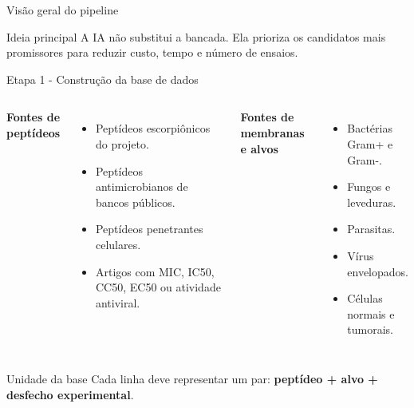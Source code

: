 \documentclass[aspectratio=169,10pt]{beamer}
\begin{document}
\begin{frame}{Visão geral do pipeline}
\begin{center}
\end{center}

\vspace{0.3cm}
\begin{block}{Ideia principal}
A IA não substitui a bancada. Ela prioriza os candidatos mais promissores para reduzir custo, tempo e número de ensaios.
\end{block}
\end{frame}

\begin{frame}{Etapa 1 - Construção da base de dados}
\begin{columns}[T]
\textbf{Fontes de peptídeos}
\begin{itemize}
  \item Peptídeos escorpiônicos do projeto.
  \item Peptídeos antimicrobianos de bancos públicos.
  \item Peptídeos penetrantes celulares.
  \item Artigos com MIC, IC50, CC50, EC50 ou atividade antiviral.
\end{itemize}

\textbf{Fontes de membranas e alvos}
\begin{itemize}
  \item Bactérias Gram+ e Gram-.
  \item Fungos e leveduras.
  \item Parasitas.
  \item Vírus envelopados.
  \item Células normais e tumorais.
\end{itemize}
\end{columns}

\vspace{0.3cm}
\begin{block}{Unidade da base}
Cada linha deve representar um par: \textbf{peptídeo + alvo + desfecho experimental}.
\end{block}
\end{frame}
\end{document}
